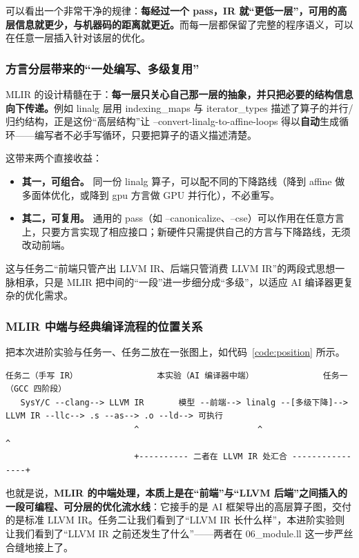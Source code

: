 \documentclass[UTF8,a4paper,10pt]{ctexart}
\begin{document}
可以看出一个非常干净的规律：\textbf{每经过一个 pass，IR 就“更低一层”，可用的高层信息就更少，与机器码的距离就更近。}而每一层都保留了完整的程序语义，可以在任意一层插入针对该层的优化。

\subsubsection{方言分层带来的“一处编写、多级复用”}

MLIR 的设计精髓在于：\textbf{每一层只关心自己那一层的抽象，并只把必要的结构信息向下传递。}例如 linalg 层用 indexing\_maps 与 iterator\_types 描述了算子的并行/归约结构，正是这份“高层结构”让 --convert-linalg-to-affine-loops 得以\textbf{自动}生成循环——编写者不必手写循环，只要把算子的语义描述清楚。

这带来两个直接收益：

\begin{itemize}
  \item \textbf{其一，可组合。} 同一份 linalg 算子，可以配不同的下降路线（降到 affine 做多面体优化，或降到 gpu 方言做 GPU 并行化），不必重写。
  \item \textbf{其二，可复用。} 通用的 pass（如 --canonicalize、--cse）可以作用在任意方言上，只要方言实现了相应接口；新硬件只需提供自己的方言与下降路线，无须改动前端。
\end{itemize}

这与任务二“前端只管产出 LLVM IR、后端只管消费 LLVM IR”的两段式思想一脉相承，只是 MLIR 把中间的“一段”进一步细分成“多级”，以适应 AI 编译器更复杂的优化需求。

\subsubsection{MLIR 中端与经典编译流程的位置关系}

把本次进阶实验与任务一、任务二放在一张图上，如代码~\ref{code:position} 所示。

\begin{lstlisting}[label=code:position]
       任务二（手写 IR）                本实验（AI 编译器中端）              任务一（GCC 四阶段）
   SysY/C --clang--> LLVM IR       模型 --前端--> linalg --[多级下降]--> LLVM IR --llc--> .s --as--> .o --ld--> 可执行
                          ^                        ^                         ^
                          +---------- 二者在 LLVM IR 处汇合 ----------------+
\end{lstlisting}

也就是说，\textbf{MLIR 的中端处理，本质上是在“前端”与“LLVM 后端”之间插入的一段可编程、可分层的优化流水线}：它接手的是 AI 框架导出的高层算子图，交付的是标准 LLVM IR。任务二让我们看到了“LLVM IR 长什么样”，本进阶实验则让我们看到了“LLVM IR 之前还发生了什么”——两者在 06\_module.ll 这一步严丝合缝地接上了。
\end{document}
